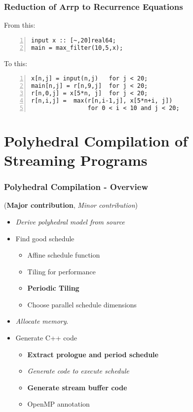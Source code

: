 \documentclass{beamer}
\begin{document}
\begin{frame}[fragile]
\frametitle{Reduction of Arrp to Recurrence Equations}

From this:

\begin{Verbatim}[numbers=left]
input x :: [~,20]real64;
main = max_filter(10,5,x);
\end{Verbatim}

To this:

\begin{Verbatim}[numbers=left]
x[n,j] = input(n,j)   for j < 20;
main[n,j] = r[n,9,j]  for j < 20;
r[n,0,j] = x[5*n, j]  for j < 20;
r[n,i,j] =  max(r[n,i-1,j], x[5*n+i, j])
                for 0 < i < 10 and j < 20;
\end{Verbatim}

\end{frame}


\section{Polyhedral Compilation of Streaming Programs}

\begin{frame}
\frametitle{Polyhedral Compilation - Overview}

(\textbf{Major contribution}, \textit{Minor contribution})

\begin{itemize}
\item \textit{Derive polyhedral model from source}
\item Find good schedule
    \begin{itemize}
    \item Affine schedule function
    \item Tiling for performance
    \item \textbf{Periodic Tiling}
    \item Choose parallel schedule dimensions
    \end{itemize}
\item \textit{Allocate memory}.
\item Generate C++ code
    \begin{itemize}
    \item \textbf{Extract prologue and period schedule}
    \item \textit{Generate code to execute schedule}
    \item \textbf{Generate stream buffer code}
    \item OpenMP annotation
    \end{itemize}
\end{itemize}


\end{frame}
\end{document}
